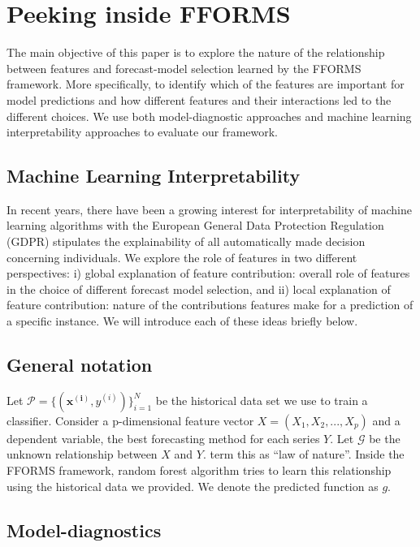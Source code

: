 \documentclass[11pt,a4paper,]{article}
\begin{document}
\section{Peeking inside FFORMS}\label{machinelearning}

The main objective of this paper is to explore the nature of the
relationship between features and forecast-model selection learned by
the FFORMS framework. More specifically, to identify which of the
features are important for model predictions and how different features
and their interactions led to the different choices. We use both
model-diagnostic approaches and machine learning interpretability
approaches to evaluate our framework.

\subsection{Machine Learning
Interpretability}\label{machine-learning-interpretability}

In recent years, there have been a growing interest for interpretability
of machine learning algorithms with the European General Data Protection
Regulation (GDPR) stipulates the explainability of all automatically
made decision concerning individuals. We explore the role of features in
two different perspectives: i) global explanation of feature
contribution: overall role of features in the choice of different
forecast model selection, and ii) local explanation of feature
contribution: nature of the contributions features make for a prediction
of a specific instance. We will introduce each of these ideas briefly
below.

\subsection{General notation}\label{general-notation}

Let \(\mathcal{P}=\{(\mathbf{x^{(i)}}, y^{(i)})\}_{i=1}^{N}\) be the
historical data set we use to train a classifier. Consider a
p-dimensional feature vector \(X=(X_1, X_2, ..., X_p)\) and a dependent
variable, the best forecasting method for each series \(Y\). Let
\(\mathcal{G}\) be the unknown relationship between \(X\) and \(Y\).
\textcite{Zhao} term this as ``law of nature''. Inside the FFORMS
framework, random forest algorithm tries to learn this relationship
using the historical data we provided. We denote the predicted function
as \(g\).

\subsection{Model-diagnostics}\label{model-diagnostics}
\end{document}
